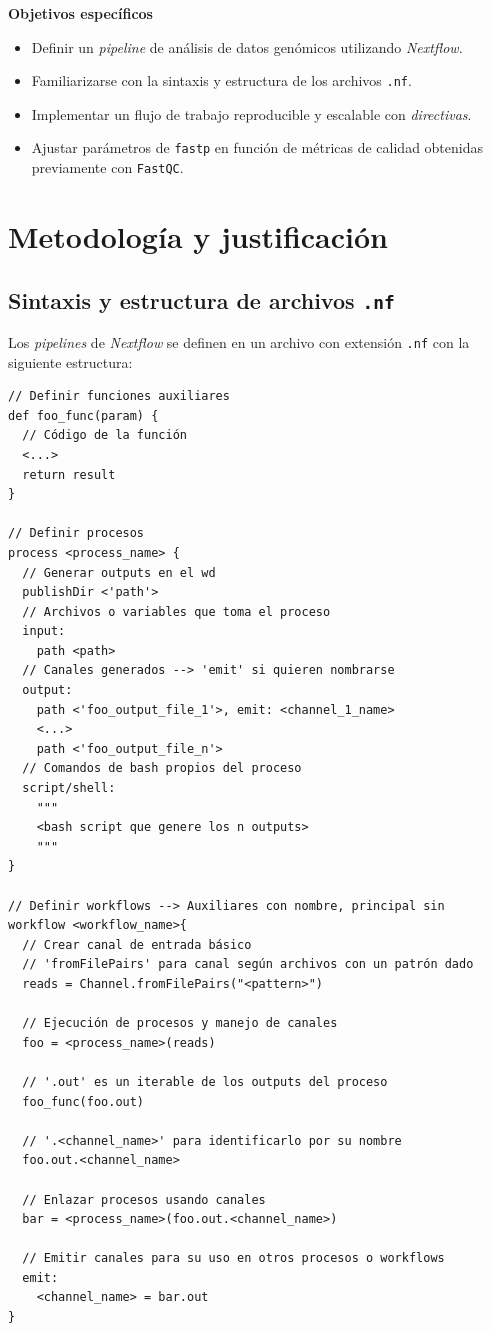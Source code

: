 \documentclass[
  letterpaper,
  DIV=11,
  numbers=noendperiod]{scrartcl}
\begin{document}
\textbf{Objetivos específicos}

\begin{itemize}
\item
  Definir un \emph{pipeline} de análisis de datos genómicos utilizando
  \emph{Nextflow}.
\item
  Familiarizarse con la sintaxis y estructura de los archivos
  \texttt{.nf}.
\item
  Implementar un flujo de trabajo reproducible y escalable con
  \emph{directivas}.
\item
  Ajustar parámetros de \texttt{fastp} en función de métricas de calidad
  obtenidas previamente con \texttt{FastQC}.
\end{itemize}

\section{Metodología y
justificación}\label{metodologuxeda-y-justificaciuxf3n}

\subsection{\texorpdfstring{Sintaxis y estructura de archivos
\texttt{.nf}}{Sintaxis y estructura de archivos .nf}}\label{sintaxis-y-estructura-de-archivos-.nf}

Los \emph{pipelines} de \emph{Nextflow} se definen en un archivo con
extensión \texttt{.nf} con la siguiente estructura:

\begin{verbatim}
// Definir funciones auxiliares
def foo_func(param) {
  // Código de la función
  <...>
  return result
}

// Definir procesos
process <process_name> {
  // Generar outputs en el wd
  publishDir <'path'>
  // Archivos o variables que toma el proceso
  input:
    path <path>
  // Canales generados --> 'emit' si quieren nombrarse
  output:
    path <'foo_output_file_1'>, emit: <channel_1_name>
    <...>
    path <'foo_output_file_n'>
  // Comandos de bash propios del proceso
  script/shell:
    """
    <bash script que genere los n outputs>
    """
}

// Definir workflows --> Auxiliares con nombre, principal sin
workflow <workflow_name>{
  // Crear canal de entrada básico
  // 'fromFilePairs' para canal según archivos con un patrón dado
  reads = Channel.fromFilePairs("<pattern>")

  // Ejecución de procesos y manejo de canales
  foo = <process_name>(reads)

  // '.out' es un iterable de los outputs del proceso
  foo_func(foo.out)

  // '.<channel_name>' para identificarlo por su nombre
  foo.out.<channel_name>

  // Enlazar procesos usando canales
  bar = <process_name>(foo.out.<channel_name>)

  // Emitir canales para su uso en otros procesos o workflows
  emit:
    <channel_name> = bar.out
}
\end{verbatim}
\end{document}
